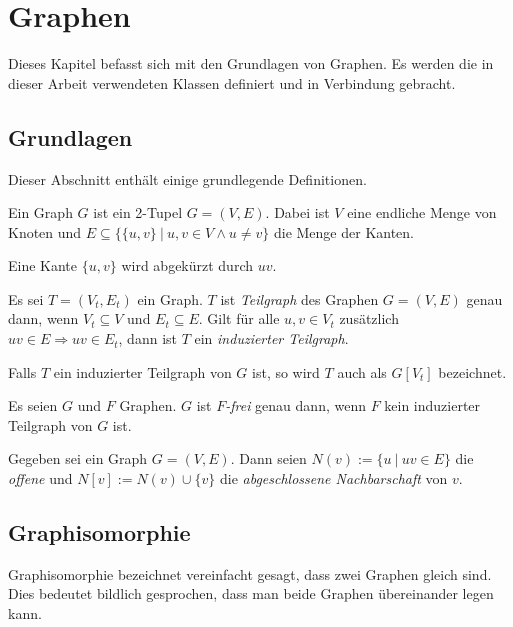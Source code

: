 \chapter{Graphen}\label{chp:Graphen}

Dieses Kapitel befasst sich mit den Grundlagen von Graphen. Es werden die in dieser Arbeit verwendeten Klassen definiert und in Verbindung gebracht. %

\section{Grundlagen}
Dieser Abschnitt enthält einige grundlegende Definitionen.

\begin{mydef}Ein Graph $G$ ist ein 2-Tupel $G=(V,E)$. Dabei ist
    $V$ eine endliche Menge von Knoten und $E \subseteq \{\{u,v\} \ |\ u,v \in V \wedge u \neq v\}$ die Menge der Kanten.

    Eine Kante $\{u,v\}$ wird abgekürzt durch $uv$.
\end{mydef}

\begin{mydef}
    Es sei $T=(V_t,E_t)$ ein Graph. $T$ ist \emph{Teilgraph} des Graphen $G=(V,E)$ genau dann, wenn $V_t \subseteq V$ und $E_t \subseteq E$. Gilt für alle $u,v \in V_t$ zusätzlich $uv \in E \Rightarrow uv \in E_t$, dann ist $T$ ein \emph{induzierter Teilgraph}.

    Falls $T$ ein induzierter Teilgraph von $G$ ist, so wird $T$ auch als $G[V_t]$ bezeichnet.
\end{mydef}

\begin{mydef}
    Es seien $G$ und $F$ Graphen. $G$ ist \emph{$F$-frei} genau dann, wenn $F$ kein induzierter Teilgraph von $G$ ist.
\end{mydef}

\begin{mydef}
    Gegeben sei ein Graph $G=(V,E)$. Dann seien $N(v):=\{u\ |\ uv \in E\}$ die \emph{offene}
und $N[v]:=N(v) \cup \{v\}$ die \emph{abgeschlossene Nachbarschaft} von $v$.
\end{mydef}

\section{Graphisomorphie}
Graphisomorphie bezeichnet vereinfacht gesagt, dass zwei Graphen gleich sind. Dies bedeutet bildlich gesprochen, dass man beide Graphen übereinander legen kann.


